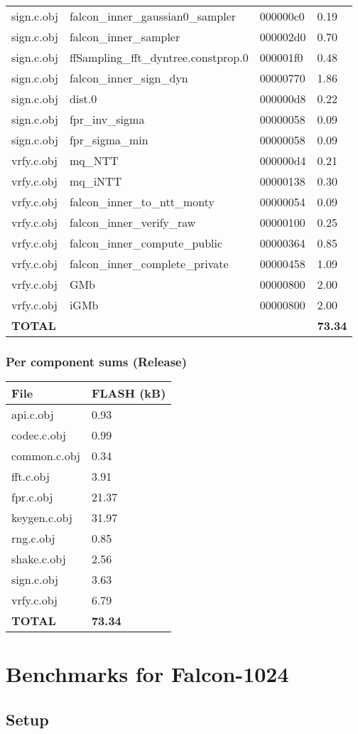 \documentclass[
]{article}
\begin{document}
\begin{longtable}[]{@{}llll@{}}
sign.c.obj & falcon\_inner\_gaussian0\_sampler & 000000c0 &
0.19\tabularnewline
sign.c.obj & falcon\_inner\_sampler & 000002d0 & 0.70\tabularnewline
sign.c.obj & ffSampling\_fft\_dyntree.constprop.0 & 000001f0 &
0.48\tabularnewline
sign.c.obj & falcon\_inner\_sign\_dyn & 00000770 & 1.86\tabularnewline
sign.c.obj & dist.0 & 000000d8 & 0.22\tabularnewline
sign.c.obj & fpr\_inv\_sigma & 00000058 & 0.09\tabularnewline
sign.c.obj & fpr\_sigma\_min & 00000058 & 0.09\tabularnewline
vrfy.c.obj & mq\_NTT & 000000d4 & 0.21\tabularnewline
vrfy.c.obj & mq\_iNTT & 00000138 & 0.30\tabularnewline
vrfy.c.obj & falcon\_inner\_to\_ntt\_monty & 00000054 &
0.09\tabularnewline
vrfy.c.obj & falcon\_inner\_verify\_raw & 00000100 & 0.25\tabularnewline
vrfy.c.obj & falcon\_inner\_compute\_public & 00000364 &
0.85\tabularnewline
vrfy.c.obj & falcon\_inner\_complete\_private & 00000458 &
1.09\tabularnewline
vrfy.c.obj & GMb & 00000800 & 2.00\tabularnewline
vrfy.c.obj & iGMb & 00000800 & 2.00\tabularnewline
\textbf{TOTAL} & & & \textbf{73.34}\tabularnewline
\bottomrule
\end{longtable}

\hypertarget{per-component-sums-release}{%
\subsubsection{Per component sums
(Release)}\label{per-component-sums-release}}

\begin{longtable}[]{@{}ll@{}}
\toprule
File & FLASH (kB)\tabularnewline
\midrule
\endhead
api.c.obj & 0.93\tabularnewline
codec.c.obj & 0.99\tabularnewline
common.c.obj & 0.34\tabularnewline
fft.c.obj & 3.91\tabularnewline
fpr.c.obj & 21.37\tabularnewline
keygen.c.obj & 31.97\tabularnewline
rng.c.obj & 0.85\tabularnewline
shake.c.obj & 2.56\tabularnewline
sign.c.obj & 3.63\tabularnewline
vrfy.c.obj & 6.79\tabularnewline
\textbf{TOTAL} & \textbf{73.34}\tabularnewline
\bottomrule
\end{longtable}

\hypertarget{benchmarks-for-falcon-1024}{%
\section{Benchmarks for Falcon-1024}\label{benchmarks-for-falcon-1024}}

\hypertarget{setup-2}{%
\subsection{Setup}\label{setup-2}}
\end{document}
